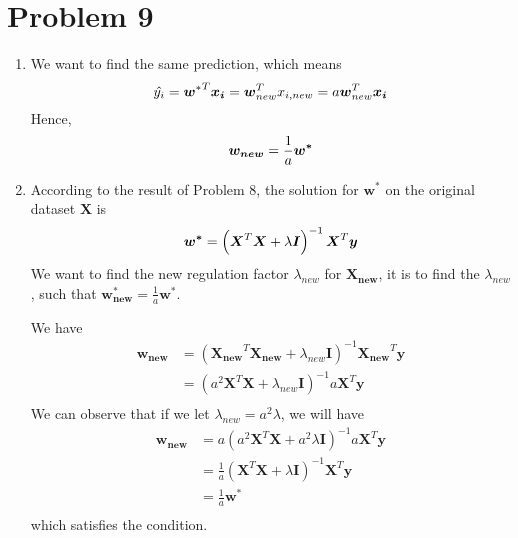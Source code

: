 \documentclass[12pt]{scrartcl}
\newcommand{\vect}[1]{\boldsymbol{#1}}
\newcommand{\ve}{\vect}
\begin{document}
  \section*{Problem 9}
  \begin{enumerate}[label = \alph*)]
      \item We want to find the same prediction, which means
      \[
          \hat{y_{i}} = {\ve{w}^{*}}^{T}\ve{x_i} =\ve{w}_{new}^{T}x_{i, new} = a\ve{w}_{new}^{T} \ve{x_i} \\
      \] 
      Hence,
      \[
      \ve{w_{new}} = \frac{1}{a}\ve{w^{*}} \\
      \] 
  \item According to the result of Problem 8, the solution for $\ve{w^{*}}$ on the original dataset $\ve{X}$ is \[
  \ve{w^{*}} =\left( \ve{X}^{T}\ve{X} + \lambda \ve{I} \right)^{-1}\ve{X}^{T}\ve{y}   \\
  \] 
  We want to find the new regulation factor $\lambda_{new}$ for $\ve{X_{new}}$, it is to find the $\lambda_{new}$, such that $\ve{w_{new}^{*}}  = \frac{1}{a}\ve{w^{*}}$.

  We have \[
      \begin{split}
      \ve{w_{new}} &= \left( \ve{X_{new}}^{T}\ve{X_{new}} + \lambda_{new}\ve{I} \right) ^{-1}\ve{X_{new}}^{T}\ve{y} \\
      &=\left( a^2 \ve{X}^{T}\ve{X} + \lambda_{new}\ve{I}\right)^{-1}a\ve{X}^{T}\ve{y} \\
      \end{split}
  \] 
  We can observe that if we let $\lambda_{new} = a^2\lambda$, we will have \[
  \begin{split}
      \ve{w_{new}} &= a\left( a^2\ve{X}^{T}\ve{X} + a^2\lambda\ve{I} \right) ^{-1}a\ve{X}^{T}\ve{y} \\
      &= \frac{1}{a} \left( \ve{X}^{T}\ve{X} + \lambda \ve{I} \right)^{-1}\ve{X}^{T}\ve{y}   \\
      &= \frac{1}{a}\ve{w^{*}} \\
  \end{split}
  \] which satisfies the condition.
  \end{enumerate}



 
\end{document}
